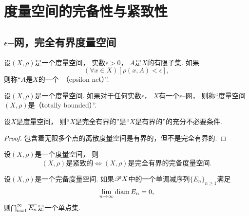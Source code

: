 \section{度量空间的完备性与紧致性}
\subsection{\texorpdfstring{$\epsilon$--网}{\textepsilon 网}，完全有界度量空间}
\begin{definition}
设\((X,\rho)\)是一个度量空间，
实数\(\epsilon>0\)，
\(A\)是\(X\)的有限子集.
如果\begin{equation*}
	(\forall x \in X)
	[\rho(x,A) < \epsilon],
\end{equation*}
则称“\(A\)是\(X\)的一个~（epsilon net）”.
\end{definition}

\begin{definition}
设\((X,\rho)\)是一个度量空间.
如果对于任何实数\(\epsilon\)，
\(X\)有一个\(\epsilon\)--网，
则称“度量空间\((X,\rho)\)是（totally bounded）”.
\end{definition}

\begin{proposition}
设\(X\)是度量空间，
则“\(X\)是完全有界的”是“\(X\)是有界的”的充分不必要条件.
\begin{proof}
包含着无限多个点的离散度量空间是有界的，但不是完全有界的.
\end{proof}
\end{proposition}

\begin{theorem}
设\((X,\rho)\)是一个度量空间，
则\begin{equation*}
	\text{$(X,\rho)$是紧致的}
	\iff
	\text{$(X,\rho)$是完全有界的完备度量空间}.
\end{equation*}
\end{theorem}

\begin{theorem}
设\((X,\rho)\)是一个完备度量空间.
如果\(\mathscr{P} X\)中的一个单调减序列\(\{E_n\}_{n\geq1}\)满足\begin{equation*}
	\lim_{n\to\infty} \operatorname{diam} E_n = 0,
\end{equation*}
则\(\bigcap_{n=1}^\infty \overline{E_n}\)是一个单点集.
\end{theorem}


